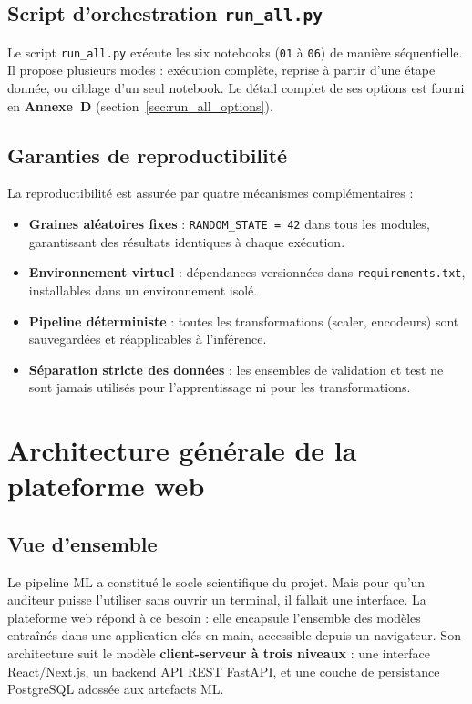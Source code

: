 \documentclass[12pt,a4paper,twoside]{report}
\begin{document}
\subsection{Script d'orchestration \texttt{run\_all.py}}

Le script \texttt{run\_all.py} exécute les six notebooks (\texttt{01} à \texttt{06}) de manière séquentielle. Il propose plusieurs modes : exécution complète, reprise à partir d'une étape donnée, ou ciblage d'un seul notebook. Le détail complet de ses options est fourni en \textbf{Annexe~D} (section~\ref{sec:run_all_options}).

\subsection{Garanties de reproductibilité}

La reproductibilité est assurée par quatre mécanismes complémentaires :
\begin{itemize}
  \item \textbf{Graines aléatoires fixes} : \texttt{RANDOM\_STATE = 42} dans tous les modules, garantissant des résultats identiques à chaque exécution.
  \item \textbf{Environnement virtuel} : dépendances versionnées dans \texttt{requirements.txt}, installables dans un environnement isolé.
  \item \textbf{Pipeline déterministe} : toutes les transformations (scaler, encodeurs) sont sauvegardées et réapplicables à l'inférence.
  \item \textbf{Séparation stricte des données} : les ensembles de validation et test ne sont jamais utilisés pour l'apprentissage ni pour les transformations.
\end{itemize}


\section{Architecture générale de la plateforme web}

\subsection{Vue d'ensemble}

Le pipeline ML a constitué le socle scientifique du projet. Mais pour qu'un auditeur puisse l'utiliser sans ouvrir un terminal, il fallait une interface. La plateforme web répond à ce besoin : elle encapsule l'ensemble des modèles entraînés dans une application clés en main, accessible depuis un navigateur. Son architecture suit le modèle \textbf{client-serveur à trois niveaux} : une interface React/Next.js, un backend API REST FastAPI, et une couche de persistance PostgreSQL adossée aux artefacts ML.
\end{document}
